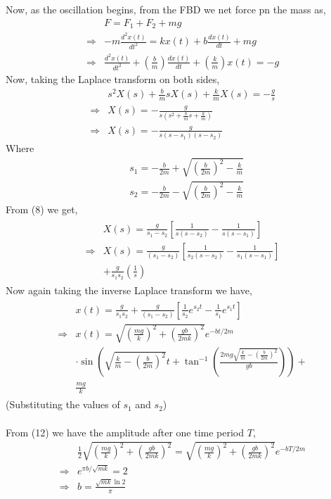 \documentclass[journal,12pt,twocolumn]{IEEEtran}
\theoremstyle{remark}
\begin{document}
\begin{enumerate}
Now, as the oscillation begins, from the FBD we net force pn the mass as,
\begin{align}
    &F=F_{1}+F_{2}+mg\\
    \Rightarrow &-m\frac{d^2x(t)}{dt^2}=kx(t)+b\frac{dx(t)}{dt}+mg\\
    \Rightarrow &\frac{d^2x(t)}{dt^2}+\left(\frac{b}{m}\right)\frac{dx(t)}{dt}+\left(\frac{k}{m}\right)x(t)=-g
\end{align}
Now, taking the Laplace transform on both sides,
\begin{align}
&s^2X(s)+\frac{b}{m}sX(s)+\frac{k}{m}X(s)=-\frac{g}{s} \\
\Rightarrow &X(s)=-\frac{g}{s\left(s^2+\frac{b}{m}s+\frac{k}{m}\right)} \\
\Rightarrow &X(s)=-\frac{g}{s(s-s_1)(s-s_2)}
\end{align}
Where
\begin{align}
&s_1=-\frac{b}{2m}+\sqrt{\left(\frac{b}{2m}\right)^2-\frac{k}{m}} \\
&s_2=-\frac{b}{2m}-\sqrt{\left(\frac{b}{2m}\right)^2-\frac{k}{m}}
\end{align}
From (8) we get,
\begin{align}
\begin{split}
&X(s)=\frac{g}{s_1-s_2}\left[\frac{1}{s(s-s_2)}-\frac{1}{s(s-s_1)}\right] \\
\Rightarrow &X(s)=\frac{g}{(s_1-s_2)}\left[\frac{1}{s_2(s-s_2)}-\frac{1}{s_1(s-s_1)}\right] \\
&+\frac{g}{s_1s_2}\left(\frac{1}{s}\right)
\end{split}
\end{align}
Now again taking the inverse Laplace transform we have,
\begin{align}
\begin{split}
&x(t)=\frac{g}{s_1s_2}+\frac{g}{(s_1-s_2)}\left[\frac{1}{s_2}e^{s_2t}-\frac{1}{s_1}e^{s_1t}\right] \\
\Rightarrow &x(t)=\sqrt{\left(\frac{mg}{k}\right)^2+\left(\frac{gb}{2mk}\right)^2}e^{-bt/2m} \\
&\cdot\sin{\left(\sqrt{\frac{k}{m}-\left(\frac{b}{2m}\right)^2}t+\tan^{-1}\left(\frac{2mg\sqrt{\frac{k}{m}-\left(\frac{b}{2m}\right)^2}}{gb}\right)\right)}+ \\
&\frac{mg}{k}
\end{split}
\end{align}
(Substituting the values of $s_1$ and $s_2$) \\
\\
From (12) we have the amplitude after one time period $T$,
\begin{align}
&\frac{1}{2}\sqrt{\left(\frac{mg}{k}\right)^2+\left(\frac{gb}{2mk}\right)^2}=\sqrt{\left(\frac{mg}{k}\right)^2+\left(\frac{gb}{2mk}\right)^2}e^{-bT/2m} \\
\Rightarrow &e^{\pi b/\sqrt{mk}}=2 \\
\Rightarrow &b=\frac{\sqrt{mk}\ln{2}}{\pi}
\end{align}


\end{enumerate}
\end{document}
